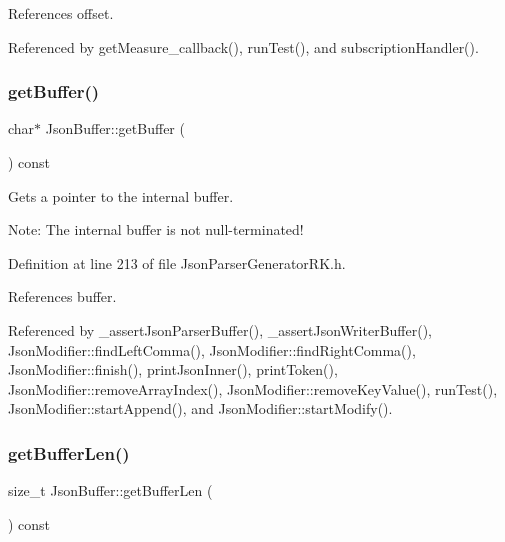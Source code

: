 References offset.



Referenced by get\+Measure\+\_\+callback(), run\+Test(), and subscription\+Handler().

\mbox{\label{class_json_buffer_af8ca5014e0275487273f94c6b9223acf}} 
\subsubsection{\texorpdfstring{get\+Buffer()}{getBuffer()}}
{\footnotesize\ttfamily char$\ast$ Json\+Buffer\+::get\+Buffer (\begin{DoxyParamCaption}{ }\end{DoxyParamCaption}) const\hspace{0.3cm}{\ttfamily [inline]}}



Gets a pointer to the internal buffer. 

Note\+: The internal buffer is not null-\/terminated! 

Definition at line 213 of file Json\+Parser\+Generator\+R\+K.\+h.



References buffer.



Referenced by \+\_\+assert\+Json\+Parser\+Buffer(), \+\_\+assert\+Json\+Writer\+Buffer(), Json\+Modifier\+::find\+Left\+Comma(), Json\+Modifier\+::find\+Right\+Comma(), Json\+Modifier\+::finish(), print\+Json\+Inner(), print\+Token(), Json\+Modifier\+::remove\+Array\+Index(), Json\+Modifier\+::remove\+Key\+Value(), run\+Test(), Json\+Modifier\+::start\+Append(), and Json\+Modifier\+::start\+Modify().

\mbox{\label{class_json_buffer_a486352be5658e94b9b9bd13563801e68}} 
\subsubsection{\texorpdfstring{get\+Buffer\+Len()}{getBufferLen()}}
{\footnotesize\ttfamily size\+\_\+t Json\+Buffer\+::get\+Buffer\+Len (\begin{DoxyParamCaption}{ }\end{DoxyParamCaption}) const\hspace{0.3cm}{\ttfamily [inline]}}




